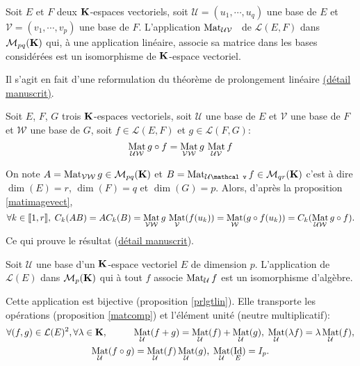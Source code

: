 \begin{propn} \label{prlgtlin}
 Soit $E$ et $F$ deux $\mathbf{K}$-espaces vectoriels, soit $\mathcal U=(u_1,\cdots,u_q)$ une base de $E$ et $\mathcal V=(v_1,\cdots,v_p)$ une base de $F$. L'application \og$\mathop{\mathrm{Mat}}_{\mathcal U \mathcal V}$\fg~ de $\mathcal L (E,F)$ dans $\mathcal M _{pq}(\mathbf{K})$ qui, à une application linéaire, associe sa matrice dans les bases considérées est un isomorphisme de $\mathbf{K}$-espace vectoriel.
\end{propn}
\begin{demo}
 Il s'agit en fait d'une reformulation du théorème de prolongement linéaire \href{https://maquisdoc-math.fra1.digitaloceanspaces.com/C2233_5.pdf}{(détail manuscrit)}.
\end{demo}

\begin{propn} \label{matcomp}
Soit $E$, $F$, $G$ trois $\mathbf{K}$-espaces vectoriels, soit $\mathcal U$ une base de $E$ et $\mathcal V$ une base de $F$ et $\mathcal W$ une base de $G$, soit $f\in\mathcal L(E,F)$ et $g\in\mathcal L(F,G)$:
\begin{displaymath}
 \mathop{\mathrm{Mat}}_{\mathcal U \mathcal W}g\circ f = \mathop{\mathrm{Mat}}_{\mathcal V \mathcal W}g\,\mathop{\mathrm{Mat}}_{\mathcal U \mathcal V}f
\end{displaymath}
\end{propn}
\begin{demo}
On note $A = \mathop{\mathrm{Mat}}_{\mathcal V \mathcal W}g \in \mathcal{M}_{p q}(\mathbf{K})$ et $B = \Mat_{\mathcal U \mathcal v}f \in \mathcal{M}_{q r}(\K)$ c'est à dire $\dim(E) = r$, $\dim(F) = q$ et $\dim(G) =p$. Alors, d'après la proposition \ref{matimagevect},
\[
 \forall k \in \llbracket 1,r \rrbracket,\;  C_k(AB) = AC_k(B) = \mathop{\mathrm{Mat}}_{\mathcal V \mathcal W}g\, \mathop{\mathrm{Mat}}_{\mathcal{V}}(f(u_k))
 = \mathop{\mathrm{Mat}}_{\mathcal{W}}(g\circ f (u_k))
 = C_k(\mathop{\mathrm{Mat}}_{\mathcal U \mathcal W}g \circ f).
\]
Ce qui prouve le résultat (\href{https://maquisdoc-math.fra1.digitaloceanspaces.com/C2233_4.pdf}{détail manuscrit}).
\end{demo}

\begin{propn}
 Soit $\mathcal U$ une base d'un $\mathbf{K}$-espace vectoriel $E$ de dimension $p$. L'application de $\mathcal L(E)$ dans $\mathcal M_p(\mathbf{K})$ qui à tout $f$ associe $\mathop{\mathrm{Mat}}_{\mathcal U}f$ est un isomorphisme d'algèbre.
\end{propn}
\begin{demo}
Cette application est bijective (proposition \ref{prlgtlin}). Elle transporte les opérations (proposition \ref{matcomp}) et l'élément unité (neutre multiplicatif):
\begin{multline*}
\forall (f,g) \in \mathcal{L}(E)^2, \forall \lambda \in \mathbf{K}, \hspace{1cm}
 \mathop{\mathrm{Mat}}_{\mathcal U}(f+g) =  \mathop{\mathrm{Mat}}_{\mathcal U}(f) +  \mathop{\mathrm{Mat}}_{\mathcal U}(g),  \; \mathop{\mathrm{Mat}}_{\mathcal U}(\lambda f) =  \lambda \mathop{\mathrm{Mat}}_{\mathcal U}(f), \\
 \mathop{\mathrm{Mat}}_{\mathcal U}(f\circ g) =  \mathop{\mathrm{Mat}}_{\mathcal U}(f)  \mathop{\mathrm{Mat}}_{\mathcal U}(g), \; \mathop{\mathrm{Mat}}_{\mathcal U}(\mathop{\mathrm{Id}}_E) = I_p.
\end{multline*}
\end{demo}

